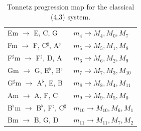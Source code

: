 \documentclass[11pt,letterpaper]{amsart}
\begin{document}
{\begin{table}[H]
\begin{minipage}{0.48\textwidth}
\begin{tabular}{ll}
        Em $\to$ E, C, G & $m_4 \to M_4, M_0, M_7$ \\
        Fm $\to$ F, C$^\sharp$, A$^\flat$ & $m_5 \to M_5, M_1, M_8$ \\
        F$^\sharp$m $\to$ F$^\sharp$, D, A & $m_6 \to M_6, M_2, M_9$ \\
        Gm $\to$ G, E$^\flat$, B$^\flat$ & $m_7 \to M_7, M_3, M_{10}$ \\
        G$^\sharp$m $\to$ A$^\flat$, E, B & $m_8 \to M_8, M_4, M_{11}$ \\
        Am $\to$ A, F, C & $m_9 \to M_9, M_5, M_0$ \\
        B$^\flat$m $\to$ B$^\flat$, F$^\sharp$, C$^\sharp$ & $m_{10} \to M_{10}, M_6, M_1$ \\
        Bm $\to$ B, G, D & $m_{11} \to M_{11}, M_7, M_2$ \\
        \bottomrule
        \end{tabular}
    \end{minipage}
    \caption{Tonnetz progression map for the classical (4,3) system.}
\end{table}}
\end{document}
